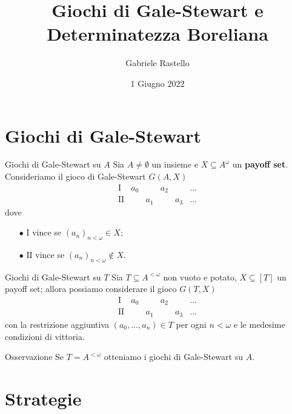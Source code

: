 \documentclass[aspectratio=43]{beamer}
\title{Giochi di Gale-Stewart e Determinatezza Boreliana}
\author{Gabriele Rastello}
\date{1 Giugno 2022}
\begin{document}
\begin{frame}
  \titlepage
\end{frame}

\section{Giochi di Gale-Stewart}

\begin{frame}{Giochi di Gale-Stewart su \(A\)}
  Sia \(A \neq \emptyset\) un insieme e \(X \subseteq A^\omega\) un \textbf{payoff set}.
  Consideriamo il gioco di Gale-Stewart \(G(A, X)\)
  \begin{equation*}
    \begin{matrix}
      \mathrm{I} & a_0 & & a_2 & & \ldots\\
      \mathrm{II} & & a_1 & & a_3 & \ldots
    \end{matrix}
  \end{equation*}
  \pause
  dove
  \begin{itemize}
  \item[\(\bullet\)] \(\mathrm{I}\) vince se \((a_n)_{n < \omega} \in X\);
  \item[\(\bullet\)] \(\mathrm{II}\) vince se \((a_n)_{n < \omega} \not\in X\).
  \end{itemize}
\end{frame}

\begin{frame}{Giochi di Gale-Stewart su \(T\)}
  Sia \(T \subseteq A^{<\omega}\) non vuoto e potato, \(X\subseteq [T]\) un payoff set; allora possiamo considerare il gioco \(G(T, X)\)
  \begin{equation*}
    \begin{matrix}
      \mathrm{I} & a_0 & & a_2 & & \ldots\\
      \mathrm{II} & & a_1 & & a_3 & \ldots
    \end{matrix}
  \end{equation*}
  con la restrizione aggiuntiva \((a_0, \ldots, a_n) \in T\) per ogni \(n < \omega\) e le medesime condizioni di vittoria.
  \pause
  \begin{block}{Osservazione}
    Se \(T = A^{<\omega}\) otteniamo i giochi di Gale-Stewart su \(A\).
  \end{block}
\end{frame}

\section{Strategie}
\end{document}
